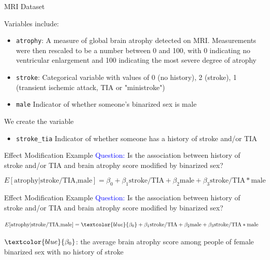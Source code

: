 \documentclass[10pt,t]{beamer}
\begin{document}
\begin{frame}{MRI Dataset}
	
	Variables include:
	\medskip	
	
	\begin{itemize}
		\item \texttt{atrophy}: A measure of global brain atrophy detected on MRI. Measurements were then rescaled to be a number between 0 and 100, with 0 indicating no ventricular enlargement and 100 indicating the most severe degree of atrophy
		\medskip
		
		\item \texttt{stroke}: Categorical variable with values of 0 (no history), 2 (stroke), 1 (transient ischemic attack, TIA or "ministroke")
		\medskip
		
		\item \texttt{male} Indicator of whether someone's binarized sex is male
	\end{itemize}
\medskip
We create the variable
\medskip
\begin{itemize}
	\item \texttt{stroke\_tia} Indicator of whether someone has a history of stroke and/or TIA
\end{itemize}

\end{frame}

\begin{frame}{Effect Modification Example}
	\textcolor{blue}{Question:} Is the association between history of stroke and/or TIA and brain atrophy score modified by binarized sex?
	
	\medskip
	\small
	\[E[\text{atrophy}|\text{stroke/TIA,male}]=\beta_0+\beta_1\text{stroke/TIA}+\beta_2\text{male}+\beta_3\text{stroke/TIA}*\text{male}\]
	
	\normalsize
	
\end{frame}

\begin{frame}{Effect Modification Example}
	\textcolor{blue}{Question:} Is the association between history of stroke and/or TIA and brain atrophy score modified by binarized sex?
	
	\medskip
	\small
	\[E[\text{atrophy}|\text{stroke/TIA,male}]=\textcolor{blue}{\beta_0}+\beta_1\text{stroke/TIA}+\beta_2\text{male}+\beta_3\text{stroke/TIA}*\text{male}\]
	
	\normalsize
	$\textcolor{blue}{\beta_0}$: the average brain atrophy score among people of female binarized sex with no history of stroke
	
	
	
\end{frame}
\end{document}
